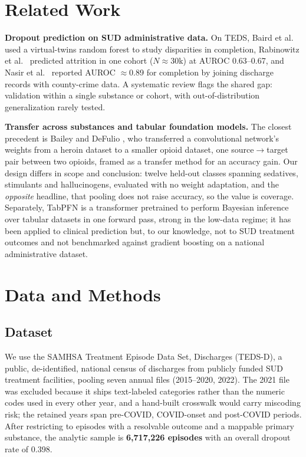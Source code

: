 \documentclass[conference]{IEEEtran}
\begin{document}
\section{Related Work}
\textbf{Dropout prediction on SUD administrative data.} On TEDS, Baird et al.\
\cite{ml_teds_disparities} used a virtual-twins random forest to study disparities in
completion, Rabinowitz et al.\ \cite{attrition2025} predicted attrition in one cohort
($N \approx 30$k) at AUROC 0.63--0.67, and Nasir et al.\ \cite{ml_jamia} reported
AUROC $\approx$0.89 for completion by joining discharge records with county-crime data. A
systematic review \cite{sud_ml_review} flags the shared gap: validation within a single substance or cohort, with out-of-distribution
generalization rarely tested.

\textbf{Transfer across substances and tabular foundation models.} The closest precedent is
Bailey and DeFulio \cite{bailey2022}, who transferred a convolutional network's weights from
a heroin dataset to a smaller opioid dataset, one source$\rightarrow$target pair between two
opioids, framed as a transfer method for an accuracy gain. Our design differs in scope and
conclusion: twelve held-out classes spanning sedatives, stimulants and hallucinogens, evaluated
with no weight adaptation, and the \emph{opposite} headline, that pooling does not raise
accuracy, so the value is coverage. Separately, TabPFN \cite{tabpfn_nature} is a transformer pretrained to
perform Bayesian inference over tabular datasets in one forward pass, strong in the low-data
regime; it has been applied to clinical prediction but, to our knowledge, not to SUD treatment
outcomes and not benchmarked against gradient boosting on a national administrative dataset.

\section{Data and Methods}

\subsection{Dataset}
We use the SAMHSA Treatment Episode Data Set, Discharges (TEDS-D), a public, de-identified,
national census of discharges from publicly funded SUD treatment facilities, pooling seven annual
files (2015--2020, 2022). The 2021 file was excluded because it ships text-labeled categories rather
than the numeric codes used in every other year, and a hand-built crosswalk would carry
miscoding risk; the retained years span pre-COVID, COVID-onset and post-COVID periods. After restricting to episodes with a resolvable outcome and a mappable primary
substance, the analytic sample is \textbf{6{,}717{,}226 episodes} with an overall dropout rate of
0.398.
\end{document}

